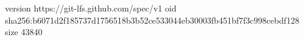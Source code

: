 version https://git-lfs.github.com/spec/v1
oid sha256:b6071d2f185737d1756518b3b52ce533044eb30003fb451bf7f3c998cebdf128
size 43840

